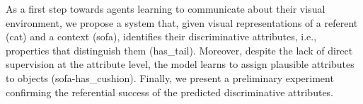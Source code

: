 As a first step towards agents learning to communicate about their visual environment, we propose a system that, given visual representations of a referent (cat) and a context (sofa), identifies their discriminative attributes, i.e., properties that distinguish them (has\_tail). Moreover, despite the lack of direct supervision at the attribute level, the model learns to assign plausible attributes to objects (sofa-has\_cushion). Finally, we present a preliminary experiment confirming the referential success of the predicted discriminative attributes.
